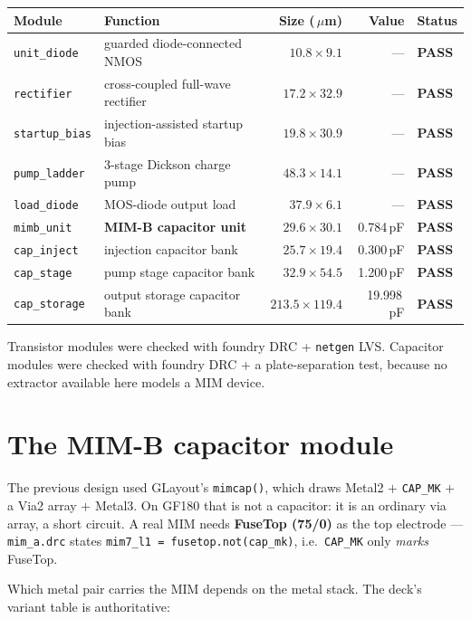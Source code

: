\documentclass[11pt,a4paper]{article}
\newcommand{\PASS}{\textcolor{green!50!black}{\textbf{PASS}}}
\newcommand{\um}{\,$\mu$m}
\begin{document}
\begin{longtable}{@{}llrrl@{}}
\toprule
\textbf{Module} & \textbf{Function} & \textbf{Size (\um)} & \textbf{Value} & \textbf{Status} \\
\midrule
\endhead
\texttt{unit\_diode}   & guarded diode-connected NMOS      & $10.8\times9.1$    & ---        & \PASS \\
\texttt{rectifier}     & cross-coupled full-wave rectifier & $17.2\times32.9$   & ---        & \PASS \\
\texttt{startup\_bias} & injection-assisted startup bias   & $19.8\times30.9$   & ---        & \PASS \\
\texttt{pump\_ladder}  & 3-stage Dickson charge pump       & $48.3\times14.1$   & ---        & \PASS \\
\texttt{load\_diode}   & MOS-diode output load             & $37.9\times6.1$    & ---        & \PASS \\
\texttt{mimb\_unit}    & \textbf{MIM-B capacitor unit}     & $29.6\times30.1$   & 0.784\,pF  & \PASS \\
\texttt{cap\_inject}   & injection capacitor bank          & $25.7\times19.4$   & 0.300\,pF  & \PASS \\
\texttt{cap\_stage}    & pump stage capacitor bank         & $32.9\times54.5$   & 1.200\,pF  & \PASS \\
\texttt{cap\_storage}  & output storage capacitor bank     & $213.5\times119.4$ & 19.998\,pF & \PASS \\
\bottomrule
\end{longtable}

Transistor modules were checked with foundry DRC + \texttt{netgen} LVS. Capacitor modules were
checked with foundry DRC + a plate-separation test, because no extractor available here models
a MIM device.

\section{The MIM-B capacitor module}
\label{sec:mim}

The previous design used GLayout's \texttt{mimcap()}, which draws Metal2 $+$ \texttt{CAP\_MK}
$+$ a Via2 array $+$ Metal3. On GF180 that is not a capacitor: it is an ordinary via array, a
short circuit. A real MIM needs \textbf{FuseTop (75/0)} as the top electrode ---
\texttt{mim\_a.drc} states \texttt{mim7\_l1 = fusetop.not(cap\_mk)}, i.e.\ \texttt{CAP\_MK}
only \emph{marks} FuseTop.

Which metal pair carries the MIM depends on the metal stack. The deck's variant table is
authoritative:
\end{document}
